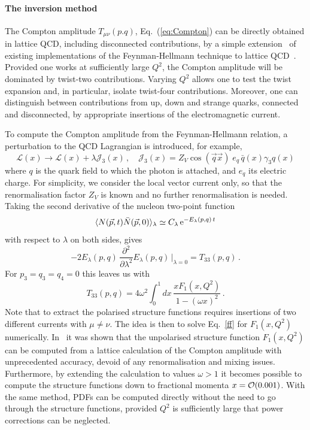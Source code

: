 \paragraph*{The inversion method} 
\label{Sec:InversionMethod}

The Compton amplitude $T_{\mu\nu}(p.q)$, Eq.~(\ref{eq:Compton}) can be
directly obtained in lattice QCD, including disconnected contributions,  by a simple extension~\cite{Chambers:2017dov} of existing implementations of the Feynman-Hellmann technique to lattice QCD~\cite{Horsley:2012pz,Chambers:2014qaa,Chambers:2015bka}.
%
Provided one works at sufficiently large $Q^2$, the Compton amplitude will be dominated by twist-two contributions.
%
Varying $Q^2$ allows one to test the twist expansion and, in particular, isolate twist-four contributions. Moreover, one can distinguish between contributions from up, down and strange quarks, connected and disconnected, by appropriate insertions of the electromagnetic current.

To compute the Compton amplitude from the Feynman-Hellmann relation, a perturbation to the QCD Lagrangian is introduced, for example,
\begin{equation}
\mathcal{L}(x) \rightarrow \mathcal{L}(x) + \lambda \mathcal{J}_3(x)\,, \quad \mathcal{J}_3(x)=Z_V\cos(\vec{q}\vec{x})\; e_q \,\bar{q}(x)\gamma_3 q(x) 
\label{in}
\end{equation}
where $q$ is the quark field to which the photon is attached, and $e_q$ its electric charge. For simplicity, we consider the local vector current only, so that the renormalisation factor $Z_V$ is known and no further renormalisation is needed. Taking the second derivative of the nucleon two-point function 
\begin{equation}
\langle N(\vec{p},t) \bar{N}(\vec{p},0)\rangle_\lambda \simeq C_\lambda\, {\rm e}^{-E_\lambda(p,q)\,t}
\end{equation}
with respect to $\lambda$ on both sides, gives
\begin{equation}
-2 E_\lambda(p,q)\, \frac{\partial^2}{\partial\lambda^2}  E_\lambda(p,q)\,\big|_{\lambda=0} = T_{33}(p,q) \,.
\end{equation}
For $p_3=q_3=q_4=0$ this leaves us with
\begin{equation}
T_{33}(p,q) = 4 \omega^2 \int_0^1 dx\,  \frac{xF_1(x,Q^2)}{1-(\omega x)^2} \,.
\label{ff}
\end{equation}
Note that to extract the polarised structure functions requires insertions of two different currents with $\mu\neq \nu$. The idea is then to solve Eq.~\eqref{ff} for $F_1(x,Q^2)$ numerically.
%
In~\cite{Chambers:2017dov} it was shown that the unpolarised structure function $F_1(x,Q^2)$ can be computed from a lattice calculation of the Compton amplitude with unprecedented accuracy, devoid of any renormalisation and mixing issues. Furthermore, by extending the calculation to values $\omega > 1$ it becomes possible
to compute the structure functions down to fractional momenta $x = {\cal O}(0.001)$. With the same method, PDFs can be computed directly without the need to go through the structure functions, provided $Q^2$ is sufficiently large that power corrections can be neglected. 

